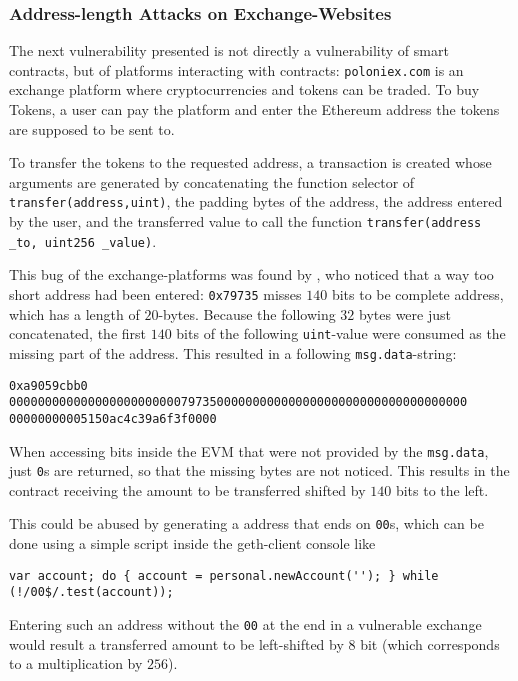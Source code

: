 \subsubsection{Address-length Attacks on Exchange-Websites}
The next vulnerability presented is not directly a vulnerability of smart contracts, but of platforms interacting with contracts: \texttt{poloniex.com} is an exchange platform where cryptocurrencies and tokens can be traded. To buy Tokens, a user can pay the platform and enter the Ethereum address the tokens are supposed to be sent to.

To transfer the tokens to the requested address, a transaction is created whose arguments are generated by concatenating the function selector of \texttt{transfer(address,uint)}, the padding bytes of the address, the address entered by the user, and the transferred value to call the function \texttt{transfer(address _to, uint256 _value)}.

This bug of the exchange-platforms was found by \cite{golemproject:addresslength}, who noticed that a way too short address had been entered: \texttt{0x79735} misses \( 140 \) bits to be complete address, which has a length of \( 20 \)-bytes. Because the following \( 32 \) bytes were just concatenated, the first  \( 140 \) bits of the following \texttt{uint}-value were consumed as the missing part of the address. This resulted in a following \texttt{msg.data}-string:
\begin{verbatim}
0xa9059cbb0
0000000000000000000000007973500000000000000000000000000000000000
00000000005150ac4c39a6f3f0000
\end{verbatim}

When accessing bits inside the EVM that were not provided by the \texttt{msg.data}, just \texttt{0}s are returned, so that the missing bytes are not noticed. This results in the contract receiving the amount to be transferred shifted by \( 140 \) bits to the left.

This could be abused by generating a address that ends on \texttt{00}s, which can be done using a simple script inside the geth-client console like
\begin{verbatim}
var account; do { account = personal.newAccount(''); } while (!/00$/.test(account));
\end{verbatim}

Entering such an address without the \texttt{00} at the end in a vulnerable exchange would result a transferred amount to be left-shifted by \( 8 \) bit (which corresponds to a multiplication by \( 256 \)).
